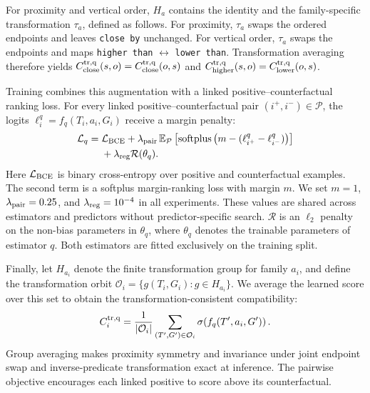 For proximity and vertical order, $H_a$ contains the identity and the family-specific transformation $\tau_a$, defined as follows. For proximity, $\tau_a$ swaps the ordered endpoints and leaves \texttt{close by} unchanged. For vertical order, $\tau_a$ swaps the endpoints and maps \texttt{higher than} $\leftrightarrow$ \texttt{lower than}. Transformation averaging therefore yields 
$C^{\rm tr,q}_{\rm close}(s,o)=C^{\rm tr,q}_{\rm close}(o,s)$ and
$C^{\rm tr,q}_{\rm higher}(s,o)=C^{\rm tr,q}_{\rm lower}(o,s)$.

Training combines this augmentation with a linked positive--counterfactual ranking loss. For every linked positive--counterfactual pair $(i^+,i^-)\in\mathcal P$, the logits $\ell_i^q=f_q(T_i,a_i,G_i)$ receive a margin penalty:
\begin{equation}
\begin{aligned}
\mathcal L_q={}&\mathcal L_{\rm BCE}
+\lambda_{\rm pair}\,\mathbb E_{\mathcal P}
\left[\operatorname{softplus}
\left(m-(\ell^q_{i^+}-\ell^q_{i^-})\right)\right]\\
&+\lambda_{\rm reg}\mathcal R(\theta_q).
\end{aligned}
\end{equation}
Here $\mathcal L_{\rm BCE}$ is binary cross-entropy over positive and counterfactual examples. The second term is a softplus margin-ranking loss with margin $m$. We set $m=1$, $\lambda_{\rm pair}=0.25$, and $\lambda_{\rm reg}=10^{-4}$ in all experiments. These values are shared across estimators and predictors without predictor-specific search. $\mathcal R$ is an $\ell_2$ penalty on the non-bias parameters in $\theta_q$, where $\theta_q$ denotes the trainable parameters of estimator $q$. Both estimators are fitted exclusively on the training split.

Finally, let $H_{a_i}$ denote the finite transformation group for family $a_i$, and define the transformation orbit $\mathcal O_i=\{g(T_i,G_i):g\in H_{a_i}\}$. We average the learned score over this set to obtain the transformation-consistent compatibility:
\begin{equation}
C_i^{\rm tr,q}=\frac{1}{|\mathcal O_i|}
\sum_{(T',G')\in\mathcal O_i} \sigma\!\left(f_q(T',a_i,G')\right).
\label{eq:algebra-projection}
\end{equation}
Group averaging makes proximity symmetry and invariance under joint endpoint swap and inverse-predicate transformation exact at inference. The pairwise objective encourages each linked positive to score above its counterfactual.

